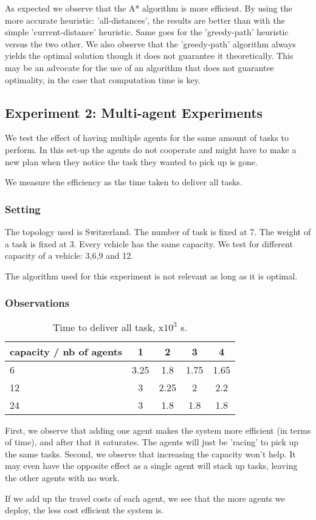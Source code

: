 \documentclass[11pt]{article}
\begin{document}
As expected we observe that the A* algorithm is more efficient. By using the more accurate heuristic: 'all-distances', the results are better than with the simple 'current-distance' heuristic. Same goes for the 'greedy-path' heuristic versus the two other. We also observe that the 'greedy-path' algorithm always yields the optimal solution though it does not guarantee it theoretically. This may be an advocate for the use of an algorithm that does not guarantee optimality, in the case that computation time is key. 



\subsection{Experiment 2: Multi-agent Experiments}
We test the effect of having multiple agents for the same amount of tasks to perform. In this set-up the agents do not cooperate and might have to make a new plan when they notice the task they wanted to pick up is gone.

We measure the efficiency as the time taken to deliver all tasks.
\subsubsection{Setting}
The topology used is Switzerland. The number of task is fixed at 7. The weight of a task is fixed at 3. Every vehicle has the same capacity. We test for different capacity of a vehicle: 3,6,9 and 12. 

The algorithm used for this experiment is not relevant as long as it is optimal. 
\subsubsection{Observations}
\begin{table}[H]
\centering
\begin{tabular}{|l|c|c|c|c|}
\hline
 capacity / nb of agents   & 1 & 2 & 3 & 4  \\ \hline
  6 &  3.25 & 1.8 & 1.75 & 1.65  \\ \hline
  12  & 3 & 2.25 & 2 & 2.2  \\ \hline
  24  & 3 & 1.8 & 1.8 & 1.8  \\ \hline
\end{tabular}
\caption{Time to deliver all task, x$10^3$ s.}
\end{table}
First, we observe that adding one agent makes the system more efficient (in terms of time), and after that it saturates. The agents will just be 'racing' to pick up the same tasks. Second, we observe that increasing the capacity won't help. It may even have the opposite effect as a single agent will stack up tasks, leaving the other agents with no work.

If we add up the travel costs of each agent, we see that the more agents we deploy, the less cost efficient the system is.
\end{document}
